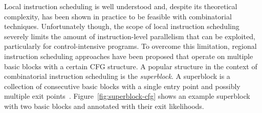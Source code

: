 \documentclass[acmsmall,authorversion,nonacm]{acmart}
\begin{document}
Local instruction scheduling is well understood and, despite its
theoretical complexity, has been shown in practice to be feasible with
combinatorial techniques.
Unfortunately though, the scope of local instruction scheduling
severely limits the amount of instruction-level parallelism that can
be exploited, particularly for control-intensive programs.
To overcome this limitation, regional instruction scheduling
approaches have been proposed that operate on multiple basic blocks
with a certain CFG structure.
A popular structure in the context of combinatorial instruction
scheduling is the \emph{superblock}.
A superblock is a collection of consecutive basic blocks with a single
entry point and possibly multiple exit points~\cite{Hwu1993}.
Figure~\ref{fig:superblock-cfg} shows an example superblock with two
basic blocks  and  annotated with their exit
likelihoods.
\end{document}
